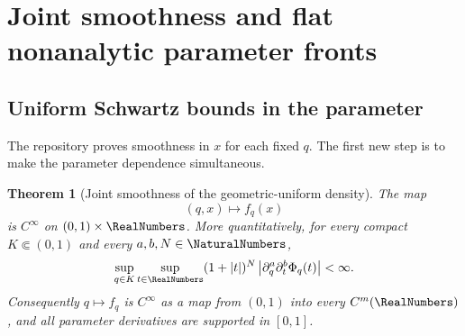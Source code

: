 \documentclass[11pt,oneside]{article}
\newtheorem{theorem}{Theorem}[section]
\theoremstyle{definition}
\theoremstyle{remark}
\begin{document}
\section{Joint smoothness and flat nonanalytic parameter fronts}
\label{sec:fronts}

\subsection{Uniform Schwartz bounds in the parameter}

The repository proves smoothness in \(x\) for each fixed \(q\).  The first new step is to make
the parameter dependence simultaneous.

\begin{theorem}[Joint smoothness of the geometric-uniform density]
\label{thm:joint-smoothness}
The map
\[
 (q,x)\longmapsto f_q(x)
\]
is \(C^\infty\) on \((0,1)\times\RealNumbers\).  More quantitatively, for every compact
\(K\Subset(0,1)\) and every \(a,b,N\in\NaturalNumbers\),
\begin{equation}
 \sup_{q\in K}\sup_{t\in\RealNumbers}
 (1+|t|)^N
 \left|\partial_q^a\partial_t^b\Phi_q(t)\right|<\infty.
 \label{eq:uniform-schwartz}
\end{equation}
Consequently \(q\mapsto f_q\) is \(C^\infty\) as a map from \((0,1)\) into every
\(C^m(\RealNumbers)\), and all parameter derivatives are supported in \([0,1]\).
\end{theorem}
\end{document}
